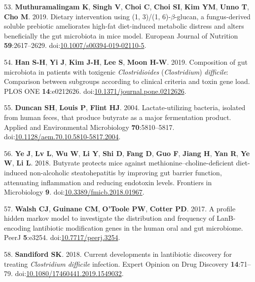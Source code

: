 \documentclass[
  12pt,
]{article}
\newenvironment{cslreferences}%
  {}%
  {\par}
\begin{document}
\begin{cslreferences}
\leavevmode\hypertarget{ref-Muthuramalingam2019}{}%
53. \textbf{Muthuramalingam K}, \textbf{Singh V}, \textbf{Choi C},
\textbf{Choi SI}, \textbf{Kim YM}, \textbf{Unno T}, \textbf{Cho M}.
2019. Dietary intervention using (1, 3)/(1, 6)-\(\beta\)-glucan, a
fungus-derived soluble prebiotic ameliorates high-fat diet-induced
metabolic distress and alters beneficially the gut microbiota in mice
model. European Journal of Nutrition \textbf{59}:2617--2629.
doi:\href{https://doi.org/10.1007/s00394-019-02110-5}{10.1007/s00394-019-02110-5}.

\leavevmode\hypertarget{ref-Han2019}{}%
54. \textbf{Han S-H}, \textbf{Yi J}, \textbf{Kim J-H}, \textbf{Lee S},
\textbf{Moon H-W}. 2019. Composition of gut microbiota in patients with
toxigenic \emph{Clostridioides} (\emph{Clostridium}) \emph{difficile}:
Comparison between subgroups according to clinical criteria and toxin
gene load. PLOS ONE \textbf{14}:e0212626.
doi:\href{https://doi.org/10.1371/journal.pone.0212626}{10.1371/journal.pone.0212626}.

\leavevmode\hypertarget{ref-Duncan2004}{}%
55. \textbf{Duncan SH}, \textbf{Louis P}, \textbf{Flint HJ}. 2004.
Lactate-utilizing bacteria, isolated from human feces, that produce
butyrate as a major fermentation product. Applied and Environmental
Microbiology \textbf{70}:5810--5817.
doi:\href{https://doi.org/10.1128/aem.70.10.5810-5817.2004}{10.1128/aem.70.10.5810-5817.2004}.

\leavevmode\hypertarget{ref-Ye2018}{}%
56. \textbf{Ye J}, \textbf{Lv L}, \textbf{Wu W}, \textbf{Li Y},
\textbf{Shi D}, \textbf{Fang D}, \textbf{Guo F}, \textbf{Jiang H},
\textbf{Yan R}, \textbf{Ye W}, \textbf{Li L}. 2018. Butyrate protects
mice against methionine--choline-deficient diet-induced non-alcoholic
steatohepatitis by improving gut barrier function, attenuating
inflammation and reducing endotoxin levels. Frontiers in Microbiology
\textbf{9}.
doi:\href{https://doi.org/10.3389/fmicb.2018.01967}{10.3389/fmicb.2018.01967}.

\leavevmode\hypertarget{ref-Walsh2017}{}%
57. \textbf{Walsh CJ}, \textbf{Guinane CM}, \textbf{O'Toole PW},
\textbf{Cotter PD}. 2017. A profile hidden markov model to investigate
the distribution and frequency of LanB-encoding lantibiotic modification
genes in the human oral and gut microbiome. PeerJ \textbf{5}:e3254.
doi:\href{https://doi.org/10.7717/peerj.3254}{10.7717/peerj.3254}.

\leavevmode\hypertarget{ref-Sandiford2018}{}%
58. \textbf{Sandiford SK}. 2018. Current developments in lantibiotic
discovery for treating \emph{Clostridium difficile} infection. Expert
Opinion on Drug Discovery \textbf{14}:71--79.
doi:\href{https://doi.org/10.1080/17460441.2019.1549032}{10.1080/17460441.2019.1549032}.


\end{cslreferences}
\end{document}
